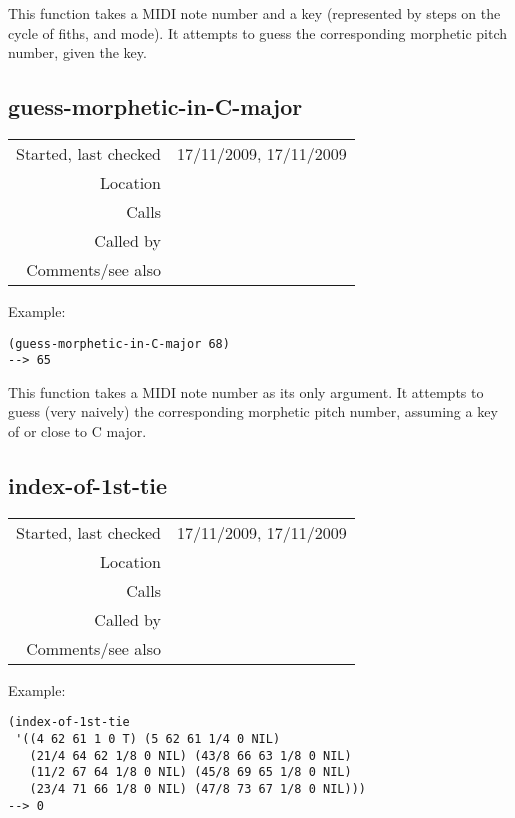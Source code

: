 \noindent This function takes a MIDI note number and
a key (represented by steps on the cycle of fiths, and
mode). It attempts to guess the corresponding
morphetic pitch number, given the key.


\subsection*{guess-morphetic-in-C-major}\label{fun:guess-morphetic-in-C-major}

\vspace{0.3cm}
\begin{tabular}{r|p{8cm}}
Started, last checked & 17/11/2009, 17/11/2009 \\
Location & \nameref{sec:director-musices} \\
Calls & \\
Called by & \nameref{fun:guess-morphetic} \\
Comments/see also & 
\end{tabular}

\vspace{0.5cm}
\noindent Example:
\begin{verbatim}
(guess-morphetic-in-C-major 68)
--> 65
\end{verbatim}

\noindent This function takes a MIDI note number as
its only argument. It attempts to guess (very naively)
the corresponding morphetic pitch number, assuming a
key of or close to C major.


\subsection*{index-of-1st-tie}\label{fun:index-of-1st-tie}

\vspace{0.3cm}
\begin{tabular}{r|p{8cm}}
Started, last checked & 17/11/2009, 17/11/2009 \\
Location & \nameref{sec:director-musices} \\
Calls & \nameref{fun:my-last} \\
Called by & \nameref{fun:resolve-tie} \\
Comments/see also &
\end{tabular}

\vspace{0.5cm}
\noindent Example:
\begin{verbatim}
(index-of-1st-tie
 '((4 62 61 1 0 T) (5 62 61 1/4 0 NIL)
   (21/4 64 62 1/8 0 NIL) (43/8 66 63 1/8 0 NIL)
   (11/2 67 64 1/8 0 NIL) (45/8 69 65 1/8 0 NIL)
   (23/4 71 66 1/8 0 NIL) (47/8 73 67 1/8 0 NIL)))
--> 0
\end{verbatim}

